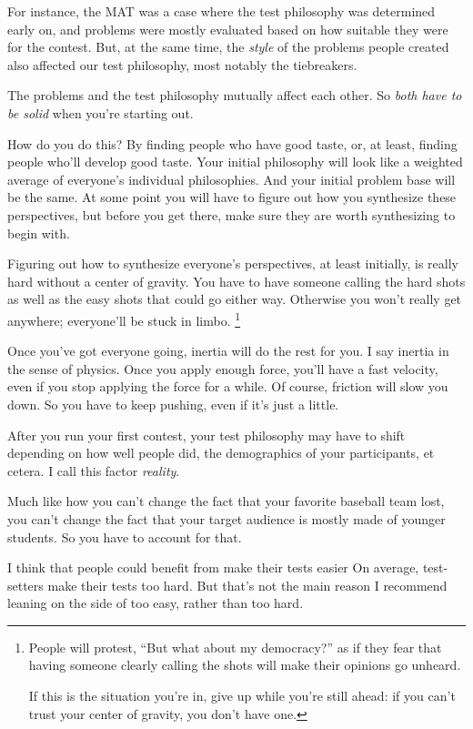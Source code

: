 \documentclass[points=false]{bounce}
\begin{document}
For instance,
the MAT was a case where
the test philosophy was determined early on,
and problems were mostly evaluated based on
how suitable they were for the contest.
But, at the same time,
the \emph{style} of the problems
people created also affected
our test philosophy,
most notably the tiebreakers.

The problems and the test philosophy
mutually affect each other. So
\emph{both have to be solid}
when you're starting out.

How do you do this?
By finding people who have good taste,
or, at least, finding people who'll
develop good taste.
Your initial philosophy will look like
a weighted average of everyone's individual philosophies.
And your initial problem base will be the same.
At some point you will have to figure out
how you synthesize these perspectives,
but before you get there, make sure
they are worth synthesizing to begin with.

Figuring out how to synthesize
everyone's perspectives, at least initially,
is really hard without a center of gravity.
You have to have someone calling the hard shots
as well as the easy shots that could go either way.
Otherwise you won't really get anywhere;
everyone'll be stuck in limbo.
\footnote{
	People will protest, ``But what about my democracy?''
	as if they fear that having someone clearly calling the shots
	will make their opinions go unheard.
	
	If this is the situation you're in,
	give up while you're still ahead:
	if you can't trust your center of gravity,
	you don't have one.
}

Once you've got everyone going,
inertia will do the rest for you.
I say inertia in the sense of physics.
Once you apply enough force,
you'll have a fast velocity,
even if you stop applying the force for a while.
Of course, friction will slow you down.
So you have to keep pushing, even if it's just a little.

After you run your first contest,
your test philosophy may have to shift
depending on how well people did,
the demographics of your participants,
et cetera.
I call this factor \emph{reality}.

Much like how you can't change
the fact that your favorite baseball team lost,
you can't change the fact
that your target audience is mostly made
of younger students.
So you have to account for that.

I think that people could benefit
from make their tests easier
On average, test-setters make their tests too hard.
But that's not the main reason
I recommend leaning on the side
of too easy, rather than too hard.
\end{document}
